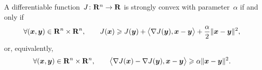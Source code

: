 \begin{proposition}
    A differentiable function~$J\colon \mathbf R^n \to \mathbf R$ is strongly convex with parameter~$\alpha$ if and only if
    \begin{equation}
        \label{eq:strong_convex_eq1}
        \forall (\vect x, \vect y) \in \real^n \times \real^n,
        \qquad J(\vect x) \geq J(\vect y) + \ip[\big]{\nabla J(\vect y), \vect x - \vect y} + \frac{\alpha}{2} \norm{\vect x - \vect y}^2,
    \end{equation}
    or, equivalently,
    \begin{equation}
        \label{eq:strong_convex_eq2}
        \forall (\vect x, \vect y) \in \real^n \times \real^n,
        \qquad \ip[\big]{\nabla J(\vect x) - \nabla J(\vect y), \vect x - \vect y}
        \geq \alpha \norm{\vect x - \vect y}^2.
    \end{equation}
\end{proposition}
